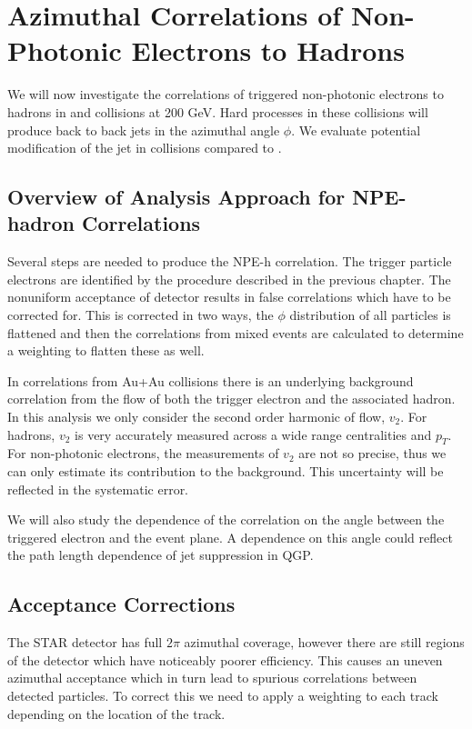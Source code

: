 \chapter{Azimuthal Correlations of Non-Photonic Electrons to Hadrons}

We will now investigate the correlations of triggered non-photonic electrons to hadrons in \auau and \pp collisions at 200 GeV. Hard processes in these collisions will produce back to back jets in the azimuthal angle $\phi$. We evaluate potential modification of the jet in \auau collisions compared to \pp. 

\section{Overview of Analysis Approach for NPE-hadron Correlations}

Several steps are needed to produce the NPE-h correlation. The trigger particle electrons are identified by the procedure described in the previous chapter. The nonuniform acceptance of detector results in false correlations which have to be corrected for. This is corrected in two ways, the $\phi$ distribution of all particles is flattened and then the correlations from mixed events are calculated to determine a weighting to flatten these as well.

In correlations from Au+Au collisions there is an underlying background correlation from the flow of both the trigger electron and the associated hadron. In this analysis we only consider the second order harmonic of flow, $v_{2}$. For hadrons, $v_{2}$ is very accurately measured across a wide range centralities and $p_{T}$. For non-photonic electrons, the measurements of $v_{2}$ are not so precise, thus we can only estimate its contribution to the background. This uncertainty will be reflected in the systematic error.

We will also study the dependence of the correlation on the angle between the triggered electron and the event plane. A dependence on this angle could reflect the path length dependence of jet suppression in QGP.

\section{Acceptance Corrections}

The STAR detector has full $2\pi$ azimuthal coverage, however there are still regions of the detector which have noticeably poorer efficiency. This causes an uneven azimuthal acceptance which in turn lead to spurious correlations between detected particles. To correct this we need to apply a weighting to each track depending on the location of the track. 

